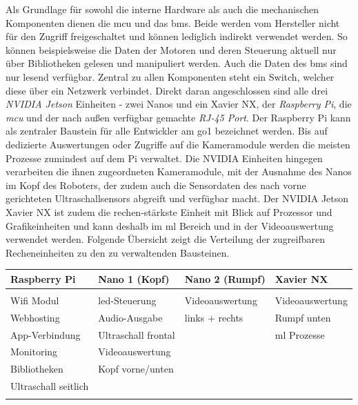 Als Grundlage für sowohl die interne Hardware als auch die mechanischen Komponenten dienen die \gls{mcu} und das \gls{bms}.
Beide werden vom Hersteller nicht für den Zugriff freigeschaltet und können lediglich indirekt verwendet werden.
So können beispielsweise die Daten der Motoren und deren Steuerung aktuell nur über Bibliotheken gelesen und manipuliert werden.
Auch die Daten des \gls{bms} sind nur lesend verfügbar.
Zentral zu allen Komponenten steht ein Switch, welcher diese über ein Netzwerk verbindet.
Direkt daran angeschlossen sind alle drei \emph{NVIDIA Jetson} Einheiten - zwei Nanos und ein Xavier NX, der \emph{Raspberry Pi},
die \emph{\gls{mcu}} und der nach außen verfügbar gemachte \emph{RJ-45 Port}.
Der Raspberry Pi kann als zentraler Baustein für alle Entwickler am \gls{go1} bezeichnet werden.
Bis auf dedizierte Auswertungen oder Zugriffe auf die Kameramodule werden die meisten Prozesse zumindest auf dem Pi verwaltet.
Die NVIDIA Einheiten hingegen verarbeiten die ihnen zugeordneten Kameramodule, mit der Ausnahme des Nanos im Kopf des Roboters,
der zudem auch die Sensordaten des nach vorne gerichteten Ultraschallsensors abgreift und verfügbar macht.
Der NVIDIA Jetson Xavier NX ist zudem die rechen-stärkste Einheit mit Blick auf Prozessor und Grafikeinheiten und kann
deshalb im \gls{ml} Bereich und in der Videoauswertung verwendet werden.
Folgende Übersicht zeigt die Verteilung der zugreifbaren Recheneinheiten zu den zu verwaltenden Bausteinen.
\newline

\begin{table}[h]
    \centering
    \begin{tabularx}{\textwidth}{X|X|X|X}
        \textbf{Raspberry Pi} & \textbf{Nano 1 (Kopf)} & \textbf{Nano 2 (Rumpf)} & \textbf{Xavier NX} \\ \hline
        &                        &                         &                    \\
        Wifi Modul            & \gls{led}-Steuerung    & Videoauswertung         & Videoauswertung    \\
        Webhosting            & Audio-Ausgabe          & links + rechts          & Rumpf unten        \\
        App-Verbindung        & Ultraschall frontal    &                         & \gls{ml} Prozesse  \\
        Monitoring            & Videoauswertung        &                         &                    \\
        Bibliotheken          & Kopf vorne/unten       &                         &                    \\
        Ultraschall seitlich  &                        &                         &                    \\
        &                        &                         &
    \end{tabularx}
    \label{tab:ueberblick_hardware_funktionen}
\end{table}

